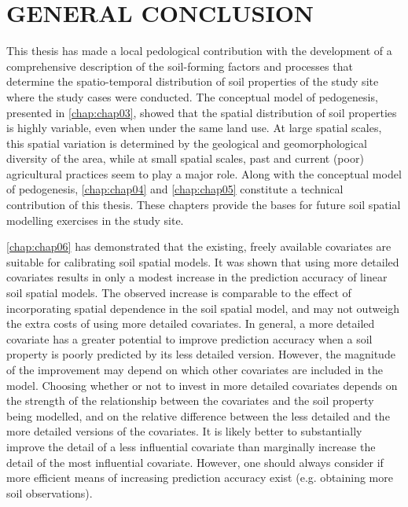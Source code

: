 \artigofalse
\chapter{GENERAL CONCLUSION}
\label{chap:conclusion}

This thesis has made a local pedological contribution with the development of a comprehensive description of 
the soil-forming factors and processes that determine the spatio-temporal distribution of soil properties of 
the study site where the study cases were conducted. The conceptual model of pedogenesis, presented in 
\autoref{chap:chap03}, showed that the spatial distribution of soil properties is highly variable, even when 
under the same land use. At large spatial scales, this spatial variation is determined by the geological and 
geomorphological diversity of the area, while at small spatial scales, past and current (poor) agricultural 
practices seem to play a major role. Along with the conceptual model of pedogenesis, \autoref{chap:chap04} and 
\autoref{chap:chap05} constitute a technical contribution of this thesis. These chapters provide the bases for 
future soil spatial modelling exercises in the study site.

\autoref{chap:chap06} has demonstrated that the existing, freely available covariates are suitable for 
calibrating soil spatial models. It was shown that using more detailed covariates results in only a modest 
increase in the prediction accuracy of linear soil spatial models. The observed increase is comparable to the 
effect of incorporating spatial dependence in the soil spatial model, and may not outweigh the extra costs of 
using more detailed covariates. In general, a more detailed covariate has a greater potential to improve 
prediction accuracy when a soil property is poorly predicted by its less detailed version. However, the 
magnitude of the improvement may depend on which other covariates are included in the model. Choosing whether 
or not to invest in more detailed covariates depends on the strength of the relationship between the 
covariates and the soil property being modelled, and on the relative difference between the less detailed and 
the more detailed versions of the covariates. It is likely better to substantially improve the detail of a 
less influential covariate than marginally increase the detail of the most influential covariate. However, one 
should always consider if more efficient means of increasing prediction accuracy exist (e.g. obtaining more 
soil observations).

